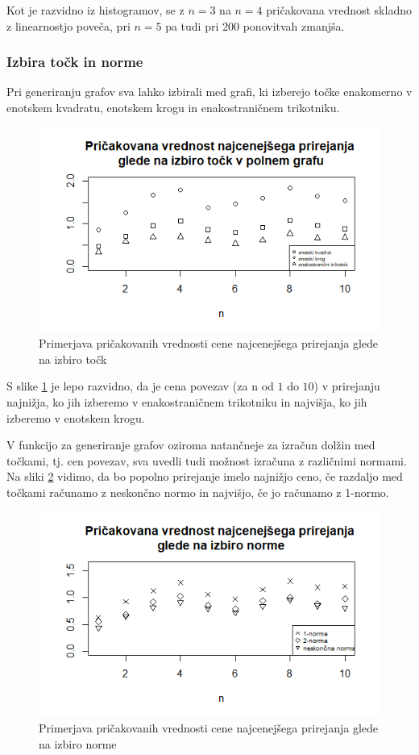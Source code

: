 \documentclass[a4paper, 11pt]{article}
\begin{document}
Kot je razvidno iz histogramov, se z $n=3$ na $n=4$ pričakovana vrednost skladno z linearnostjo poveča, pri $n=5$ pa tudi pri $200$ ponovitvah zmanjša.

\subsubsection*{Izbira točk in norme}
Pri generiranju grafov sva lahko izbirali med grafi, ki izberejo točke enakomerno v enotskem kvadratu, enotskem krogu in enakostraničnem trikotniku.
\begin{figure}[!htb]
    \includegraphics[scale=0.5]{izbira_tock_polni}
    \centering
    \caption{Primerjava pričakovanih vrednosti cene najcenejšega prirejanja glede na izbiro točk}
    \label{fig:tocke}
\end{figure}

S slike \ref{fig:tocke} je lepo razvidno, da je cena povezav (za n od $1$ do $10$) v prirejanju najnižja, ko jih izberemo v enakostraničnem trikotniku in najvišja, ko jih izberemo v enotskem krogu.

V funkcijo za generiranje grafov oziroma natančneje za izračun dolžin med točkami, tj. cen povezav, sva uvedli tudi možnost izračuna z različnimi normami.
Na sliki \ref{fig:norme} vidimo, da bo popolno prirejanje imelo najnižjo ceno, če razdaljo med točkami računamo z neskončno normo in najvišjo, če jo računamo z 1-normo.

\begin{figure}[!htb]
    \includegraphics[scale=0.6]{izbira_norme}
    \centering
    \caption{Primerjava pričakovanih vrednosti cene najcenejšega prirejanja glede na izbiro norme}
    \label{fig:norme}
\end{figure}
\end{document}
